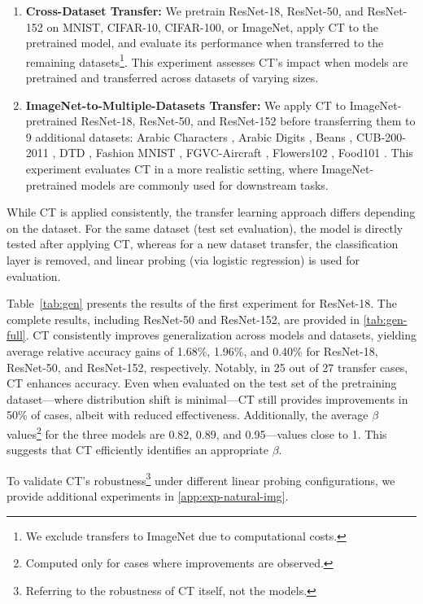 \begin{enumerate}
    \item \textbf{Cross-Dataset Transfer:} We pretrain ResNet-18, ResNet-50, and ResNet-152 on MNIST, CIFAR-10, CIFAR-100, or ImageNet, apply CT to the pretrained model, and evaluate its performance when transferred to the remaining datasets\footnote{We exclude transfers to ImageNet due to computational costs.}. This experiment assesses CT’s impact when models are pretrained and transferred across datasets of varying sizes.
    \item \textbf{ImageNet-to-Multiple-Datasets Transfer:} We apply CT to ImageNet-pretrained ResNet-18, ResNet-50, and ResNet-152 before transferring them to 9 additional datasets: Arabic Characters \cite{el2017arabchar}, Arabic Digits \cite{el2016arabdigit}, Beans \cite{makerere2020beans}, CUB-200-2011 \cite{wah2011CUB}, DTD \cite{cimpoi14dtd}, Fashion MNIST \cite{xiao2017fashionmnist}, FGVC-Aircraft \cite{maji2013fgvc}, Flowers102 \cite{nilsback2008flowers102}, Food101 \cite{bossard14food101}. This experiment evaluates CT in a more realistic setting, where ImageNet-pretrained models are commonly used for downstream tasks.
\end{enumerate}

While CT is applied consistently, the transfer learning approach differs depending on the dataset. For the same dataset (test set evaluation), the model is directly tested after applying CT, whereas for a new dataset transfer, the classification layer is removed, and linear probing (via logistic regression) is used for evaluation.

Table~\ref{tab:gen} presents the results of the first experiment for ResNet-18. The complete results, including ResNet-50 and ResNet-152, are provided in \cref{tab:gen-full}. CT consistently improves generalization across models and datasets, yielding average relative accuracy gains of 1.68\%, 1.96\%, and 0.40\% for ResNet-18, ResNet-50, and ResNet-152, respectively. Notably, in 25 out of 27 transfer cases, CT enhances accuracy. Even when evaluated on the test set of the pretraining dataset—where distribution shift is minimal—CT still provides improvements in 50\% of cases, albeit with reduced effectiveness. Additionally, the average $\beta$ values\footnote{Computed only for cases where improvements are observed.} for the three models are 0.82, 0.89, and 0.95—values close to 1. This suggests that CT efficiently identifies an appropriate $\beta$.

To validate CT’s robustness\footnote{Referring to the robustness of CT itself, not the models.} under different linear probing configurations, we provide additional experiments in \cref{app:exp-natural-img}.

